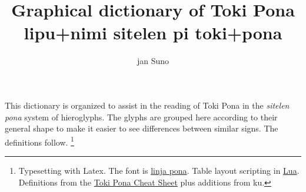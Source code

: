 \documentclass{article}
\title{Graphical dictionary of Toki Pona \\[1ex]{\tpf lipu+nimi sitelen pi toki+pona}}
\author{jan Suno}
\begin{document}
\maketitle
This dictionary is organized to assist in the reading of
Toki Pona in the \textit{sitelen} \textit{pona}
system of hieroglyphs.  The glyphs are grouped here
according to their general shape to make it easier to
see differences between similar signs.  The definitions
follow.
\footnote{Typesetting with Latex.  The font is
  \href{http://musilili.net/linja-pona/}{linja pona}.
  Table layout scripting in
  \href{http://lua.org}{Lua}.  Definitions from the
  \href{https://blinry.org/toki-pona-cheat-sheet}{Toki Pona Cheat Sheet}
  plus additions from ku.}


\pagebreak
\newcommand\tpDef[2]{\textbf{#1} {\large\tpf #1} #2}
\end{document}
